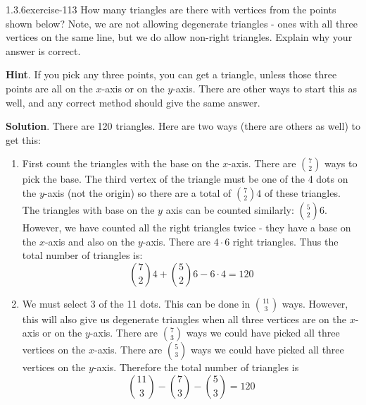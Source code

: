 \documentclass[twoside,11pt,]{book}
\numberwithin{equation}{chapter}
\begin{document}
\begin{divisionsolution}{1.3.6}{}{exercise-113}%
\hypertarget{p-1848}{}%
How many triangles are there with vertices from the points shown below? Note, we are not allowing degenerate triangles - ones with all three vertices on the same line, but we do allow non-right triangles. Explain why your answer is correct.%
\begin{sidebyside}{1}{0.25}{0.25}{0}%
\begin{sbspanel}{0.5}%
\end{sbspanel}%
\end{sidebyside}%
\par\smallskip%
\noindent\textbf{Hint}.\quad%
\hypertarget{p-1849}{}%
If you pick any three points, you can get a triangle, unless those three points are all on the \(x\)-axis or on the \(y\)-axis.  There are other ways to start this as well, and any correct method should give the same answer.%
\par\smallskip%
\noindent\textbf{Solution}.\quad%
\hypertarget{p-1850}{}%
There are 120 triangles. Here are two ways (there are others as well) to get this:\leavevmode%
\begin{enumerate}[label=(\alph*)]
\item\hypertarget{li-1242}{}\hypertarget{p-1851}{}%
First count the triangles with the base on the \(x\)-axis. There are \({7 \choose 2}\) ways to pick the base. The third vertex of the triangle must be one of the 4 dots on the \(y\)-axis (not the origin) so there are a total of \({7 \choose 2}4\) of these triangles. The triangles with base on the \(y\) axis can be counted similarly: \({5 \choose 2}6\). However, we have counted all the right triangles twice - they have a base on the \(x\)-axis and also on the \(y\)-axis. There are \(4 \cdot 6\) right triangles. Thus the total number of triangles is:%
\begin{equation*}
{7 \choose 2}4 + {5 \choose 2}6 - 6\cdot 4 = 120
\end{equation*}
%
\item\hypertarget{li-1243}{}\hypertarget{p-1852}{}%
We must select 3 of the 11 dots. This can be done in \({11 \choose 3}\) ways. However, this will also give us degenerate triangles when all three vertices are on the \(x\)-axis or on the \(y\)-axis. There are \({7 \choose 3}\) ways we could have picked all three vertices on the \(x\)-axis. There are \({5 \choose 3}\) ways we could have picked all three vertices on the \(y\)-axis. Therefore the total number of triangles is%
\begin{equation*}
{11 \choose 3} - {7 \choose 3} - {5 \choose 3} = 120
\end{equation*}
%
\end{enumerate}
%
\end{divisionsolution}%
\end{document}
